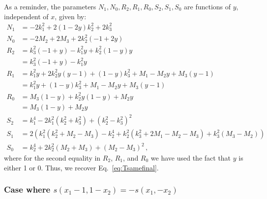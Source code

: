 \documentclass[twoside]{article}
\begin{document}
As a reminder, the parameters $N_1, N_0, R_2, R_1, R_0, S_2, S_1, S_0$ are functions of $y$, independent of $x$, given by:
\begin{align*}
N_1 &= - 2 k_1^2+ 2 (1-2y) k_2^2 + 2 k_3^2\\
N_0 &= -2 M_2 + 2 M_3 + 2 k_2^2 (-1+2y) \\
R_2 &= k_3^2 (-1 + y) - k_1^2 y + k_2^2 (1 - y) y\\
& = k_3^2 (-1 + y) - k_1^2 y \\
R_1 &= k_1^2 y+ 2 k_2^2 y\left(y-1\right)+(1-y) k_3^2 + M_1 - M_2 y+M_3 (y-1) \\
&= k_1^2 y +(1-y) k_3^2 + M_1 - M_2 y+M_3 (y-1)\\
R_0 &= M_3 (1-y) + k_2^2 y (1-y) + M_2 y \\
&= M_3 (1-y) + M_2 y \\
S_2 &= k_1^4-2 k_1^2 (k_2^2+k_3^2)+(k_2^2-k_3^2)^2 \\
S_1 &= 2 \left(k_1^2 (k_2^2+M_2-M_3)-k_2^4+k_2^2 (k_3^2+2 M_1-M_2-M_3)+k_3^2 (M_3-M_2)\right) \\
S_0 &= k_2^4+2 k_2^2 (M_2+M_3)+(M_2-M_3)^2\,,
\end{align*}
where for the second equality in $R_2$, $R_1$, and $R_0$ we have used the fact that $y$ is either 1 or 0.
Thus, we recover Eq.~\eqref{eq:Tsamefinal}.

\subsubsection{Case where $s(x_1-1,1-x_2)=-s(x_1,-x_2)$}
\end{document}
